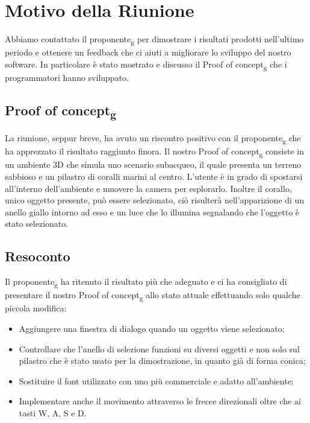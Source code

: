 \section{Motivo della Riunione}
Abbiamo contattato il proponente\textsubscript{g} per dimostrare i risultati prodotti nell'ultimo periodo e ottenere un feedback che ci aiuti a migliorare lo sviluppo del nostro software. \newline
In particolare è stato mostrato e discusso il Proof of concept\textsubscript{g} che i programmatori hanno sviluppato.

\subsection{Proof of concept\textsubscript{g}}
La riunione, seppur breve, ha avuto un riscontro positivo con il proponente\textsubscript{g} che ha apprezzato il risultato raggiunto finora. \newline
Il nostro Proof of concept\textsubscript{g} consiste in un ambiente 3D che simula uno scenario subacqueo, il quale presenta un terreno sabbioso e un pilastro di coralli marini al centro. \newline
L'utente è in grado di spostarsi all'interno dell'ambiente e muovere la camera per esplorarlo. \newline
Inoltre il corallo, unico oggetto presente, può essere selezionato, ciò risulterà nell'apparizione di un anello giallo intorno ad esso e un luce che lo illumina segnalando che l'oggetto è stato selezionato.

\subsection{Resoconto}
Il proponente\textsubscript{g} ha ritenuto il risultato più che adeguato e ci ha consigliato di presentare il nostro Proof of concept\textsubscript{g} allo stato attuale effettuando solo qualche piccola modifica: \begin{itemize}
	\item Aggiungere una finestra di dialogo quando un oggetto viene selezionato;
	\item Controllare che l'anello di selezione funzioni su diversi oggetti e non solo sul pilastro che è stato usato per la dimostrazione, in quanto già di forma conica;
	\item Sostituire il font utilizzato con uno più commerciale e adatto all'ambiente;
	\item Implementare anche il movimento attraverso le frecce direzionali oltre che ai tasti W, A, S e D. 
\end{itemize}


